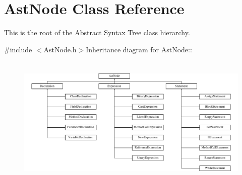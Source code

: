 \hypertarget{classAstNode}{
\section{AstNode Class Reference}
\label{classAstNode}
}


This is the root of the Abstract Syntax Tree class hierarchy.  


{\ttfamily \#include $<$AstNode.h$>$}Inheritance diagram for AstNode::\begin{figure}[H]
\begin{center}
\leavevmode
\includegraphics[height=6.39269cm]{classAstNode}
\end{center}
\end{figure}
